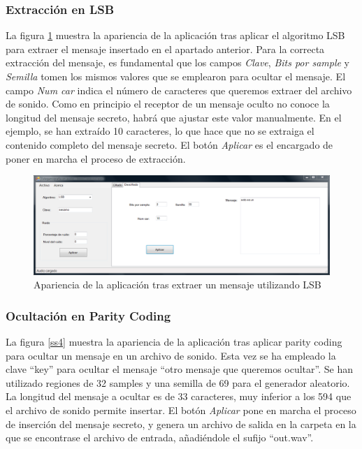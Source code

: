 \documentclass[12pt]{article}
\begin{document}
\subsubsection{Extracción en LSB}

La figura \ref{ss3} muestra la apariencia de la aplicación tras aplicar el algoritmo LSB para extraer el mensaje insertado en el apartado anterior. Para la correcta extracción del mensaje, es fundamental que los campos \emph{Clave}, \emph{Bits por sample} y \emph{Semilla} tomen los mismos valores que se emplearon para ocultar el mensaje. El campo \emph{Num car} indica el número de caracteres que queremos extraer del archivo de sonido. Como en principio el receptor de un mensaje oculto no conoce la longitud del mensaje secreto, habrá que ajustar este valor manualmente. En el ejemplo, se han extraído 10 caracteres, lo que hace que no se extraiga el contenido completo del mensaje secreto. El botón \emph{Aplicar} es el encargado de poner en marcha el proceso de extracción.

\begin{figure}[h]
  \centering
    \includegraphics[width=\textwidth]{img/ss3}
  \caption{Apariencia de la aplicación tras extraer un mensaje utilizando LSB}
  \label{ss3}
\end{figure}

\subsubsection{Ocultación en Parity Coding}

La figura \ref{ss4} muestra la apariencia de la aplicación tras aplicar parity coding para ocultar un mensaje en un archivo de sonido. Esta vez se ha empleado la clave ``key'' para ocultar el mensaje ``otro mensaje que queremos ocultar''. Se han utilizado regiones de 32 samples y una semilla de 69 para el generador aleatorio. La longitud del mensaje a ocultar es de 33 caracteres, muy inferior a los 594 que el archivo de sonido permite insertar. El botón \emph{Aplicar} pone en marcha el proceso de inserción del mensaje secreto, y genera un archivo de salida en la carpeta en la que se encontrase el archivo de entrada, añadiéndole el sufijo ``out.wav''.
\end{document}
